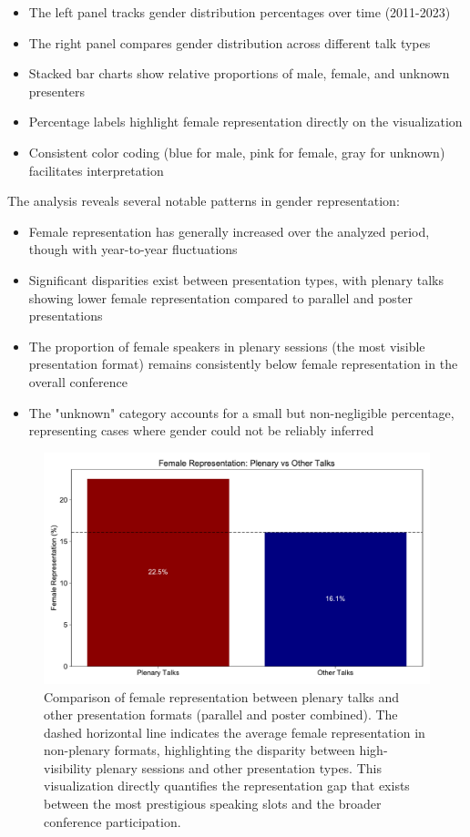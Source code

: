\documentclass[a4paper,11pt]{article}
\begin{document}
\begin{itemize}
    \item The left panel tracks gender distribution percentages over time (2011-2023)
    \item The right panel compares gender distribution across different talk types
    \item Stacked bar charts show relative proportions of male, female, and unknown presenters
    \item Percentage labels highlight female representation directly on the visualization
    \item Consistent color coding (blue for male, pink for female, gray for unknown) facilitates interpretation
\end{itemize}

The analysis reveals several notable patterns in gender representation:

\begin{itemize}
    \item Female representation has generally increased over the analyzed period, though with year-to-year fluctuations
    \item Significant disparities exist between presentation types, with plenary talks showing lower female representation compared to parallel and poster presentations
    \item The proportion of female speakers in plenary sessions (the most visible presentation format) remains consistently below female representation in the overall conference
    \item The "unknown" category accounts for a small but non-negligible percentage, representing cases where gender could not be reliably inferred
\end{itemize}

\begin{figure}[H]
\centering
\includegraphics[width=\textwidth]{figures/gender_representation_comparison.pdf}
\caption{Comparison of female representation between plenary talks and other presentation formats (parallel and poster combined). The dashed horizontal line indicates the average female representation in non-plenary formats, highlighting the disparity between high-visibility plenary sessions and other presentation types. This visualization directly quantifies the representation gap that exists between the most prestigious speaking slots and the broader conference participation.}
\label{fig:gender_representation}
\end{figure}
\end{document}
